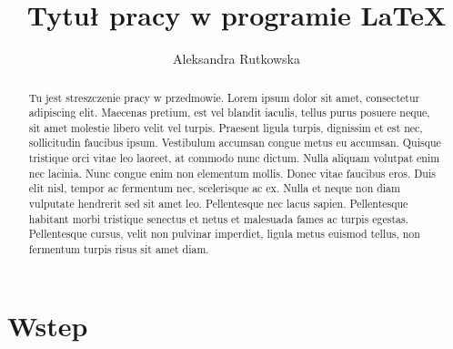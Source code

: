 \documentclass[12pt,a4paper]{article}
\title{Tytuł pracy w programie \LaTeX}
\author{Aleksandra Rutkowska}
\begin{document}
	\maketitle
	
	\begin{abstract}
		Tu jest streszczenie pracy w przedmowie. Lorem ipsum dolor sit amet, consectetur adipiscing elit. Maecenas pretium, est vel blandit iaculis, tellus purus posuere neque, sit amet molestie libero velit vel turpis. Praesent ligula turpis, dignissim et est nec, sollicitudin faucibus ipsum. Vestibulum accumsan congue metus eu accumsan. Quisque tristique orci vitae leo laoreet, at commodo nunc dictum. Nulla aliquam volutpat enim nec lacinia. Nunc congue enim non elementum mollis. Donec vitae faucibus eros. Duis elit nisl, tempor ac fermentum nec, scelerisque ac ex. Nulla et neque non diam vulputate hendrerit sed sit amet leo. Pellentesque nec lacus sapien. Pellentesque habitant morbi tristique senectus et netus et malesuada fames ac turpis egestas. Pellentesque cursus, velit non pulvinar imperdiet, ligula metus euismod tellus, non fermentum turpis risus sit amet diam.
	\end{abstract}
	
	\newpage
	
	\tableofcontents
	\listoftables
	\listoffigures
	
	\newpage
	
	\section{Wstep}
\end{document}
